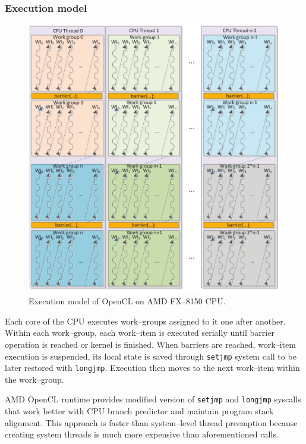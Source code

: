 \subsubsection{Execution model}
\begin{figure}[htb]
  \begin{center}
    \includegraphics[width=\textwidth]{chapters/opencl/bulldozerexec.png}
  \end{center}
  \caption{Execution model of OpenCL on AMD FX--8150 CPU.}
  \label{fig:clbullexec}
\end{figure}

Each core of the CPU executes work--groups assigned to it one after another.
Within each work--group, each work--item is executed serially until barrier
operation is reached or kernel is finished. When barriers are reached,
work--item execution is suspended, its local state is saved through
\texttt{setjmp} system call to be later restored with \texttt{longjmp}.
Execution then moves to the next work--item within the work--group.

AMD OpenCL
runtime provides modified version of \texttt{setjmp} and \texttt{longjmp} syscalls
that work better with CPU branch predictor and maintain program stack alignment.
This approach is faster than system--level thread preemption because creating
system threads is much more expensive than aforementioned calls.


